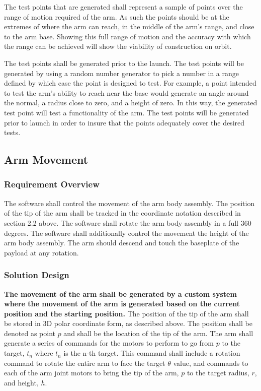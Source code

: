 \documentclass[letterpaper,10pt]{article}
\begin{document}
The test points that are generated shall represent a sample of points over the range of motion required 
of the arm. As such the points should be at the extremes of where the arm can reach, in the middle of 
the arm's range, and close to the arm base. Showing this full range of motion and the accuracy with 
which the range can be achieved will show the viability of construction on orbit.

The test points shall be generated prior to the launch. The test points will be generated by using a 
random number generator to pick a number in a range defined by which case the point is designed to test. 
For example, a point intended to test the arm's ability to reach near the base would generate an angle 
around the normal, a radius close to zero, and a height of zero. In this way, the generated test point 
will test a functionality of the arm. The test points will be generated prior to launch in order to 
insure that the points adequately cover the desired tests.

\subsection{Arm Movement}
\subsubsection{Requirement Overview}
The software shall control the movement of the arm body assembly. 
The position of the tip of the arm shall be tracked in the coordinate notation described in section 2.2 above.
The software shall rotate the arm body assembly in a full 360 degrees.
The software shall additionally control the movement the height of the arm body assembly.
The arm should descend and touch the baseplate of the payload at any rotation.

\subsubsection{Solution Design}
\textbf{The movement of the arm shall be generated by a custom system where the movement of the arm is 
generated based on the current position and the starting position.} 
The position of the tip of the arm shall be stored in 3D polar coordinate form, as described above. 
The position shall be denoted as point \(p\) and shall be the location of the tip of the arm.
The arm shall generate a series of commands for the motors to perform to go from \(p\) to the target, 
\(t_{n}\) where \(t_{n}\) is the n-th target. This command shall include a rotation command to rotate 
the entire arm to face the target \(\theta\) value, and commands to each of the arm joint motors to 
bring the tip of the arm, \(p\) to the target radius, \(r\), and height, \(h\).
\end{document}
